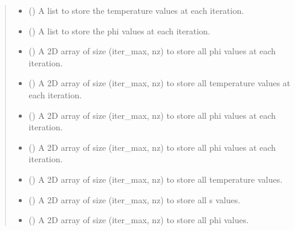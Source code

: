 \documentclass[a4paper,11pt,english,openany]{sphinxmanual}
\begin{document}
\begin{fulllineitems}
\begin{quote}
\begin{description}
\begin{itemize}
\item {} 
\sphinxAtStartPar
{} () \textendash{} A list to store the temperature values at each iteration.

\item {} 
\sphinxAtStartPar
{} () \textendash{} A list to store the phi values at each iteration.

\item {} 
\sphinxAtStartPar
{} () \textendash{} A 2D array of size (iter\_max, nz) to store all phi values at each iteration.

\item {} 
\sphinxAtStartPar
{} () \textendash{} A 2D array of size (iter\_max, nz) to store all temperature values at each iteration.

\item {} 
\sphinxAtStartPar
{} () \textendash{} A 2D array of size (iter\_max, nz) to store all phi values at each iteration.

\item {} 
\sphinxAtStartPar
{} () \textendash{} A 2D array of size (iter\_max, nz) to store all phi values at each iteration.

\item {} 
\sphinxAtStartPar
{} () \textendash{} A 2D array of size (iter\_max, nz) to store all temperature values.

\item {} 
\sphinxAtStartPar
{} () \textendash{} A 2D array of size (iter\_max, nz) to store all s values.

\item {} 
\sphinxAtStartPar
{} () \textendash{} A 2D array of size (iter\_max, nz) to store all phi values.


\end{itemize}
\end{description}
\end{quote}
\end{fulllineitems}
\end{document}
